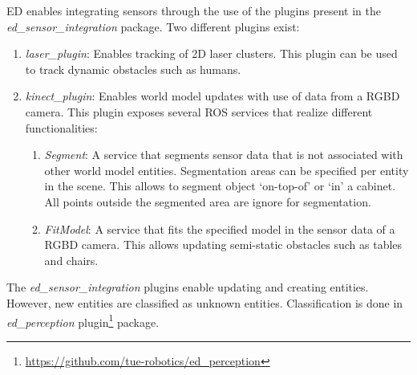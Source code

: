 ED enables integrating sensors through the use of the plugins present in the \textit{ed\_sensor\_integration} package.
Two different plugins exist:
\begin{enumerate}
\item \emph{laser\_plugin}: Enables tracking of 2D laser clusters. This plugin can be used to track dynamic obstacles such as humans.
\item \emph{kinect\_plugin}: Enables world model updates with use of data from a RGBD camera. This plugin exposes several ROS services that realize different functionalities:
\begin{enumerate}[label=(\alph*)]
\item \emph{Segment}: A service that segments sensor data that is not associated with other world model entities. Segmentation areas can be specified per entity in the scene. This allows to segment object `on-top-of’ or ‘in’ a cabinet. All points outside the segmented area are ignore for segmentation.
\item \emph{FitModel}: A service that fits the specified model in the sensor data of a RGBD camera. This allows updating semi-static obstacles such as tables and chairs.
\end{enumerate}
\end{enumerate}

The \emph{ed\_sensor\_integration} plugins enable updating and creating entities. However, new entities are classified as unknown entities. Classification is done in \emph{ed\_perception} plugin\footnote{\url{https://github.com/tue-robotics/ed_perception}} package. 